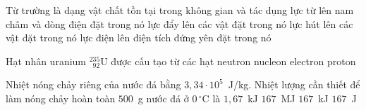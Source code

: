 	\begin{ex}%
		Từ trường là dạng vật chất tồn tại trong không gian và tác dụng
		\choice
		{\True lực từ lên nam châm và dòng điện đặt trong nó}
		{lực đẩy lên các vật đặt trong nó}
		{lực hút lên các vật đặt trong nó}
		{lực điện lên điện tích đứng yên đặt trong nó}
	\end{ex}

	\begin{ex}%
		Hạt nhân uranium $^{235}_{\phantom{2}92}\text{U}$ được cấu tạo từ các hạt
		\choice
		{neutron}
		{\True nucleon}
		{electron}
		{proton}
	\end{ex}

	\begin{ex}%
		Nhiệt nóng chảy riêng của nước đá bằng $3{,}34\cdot 10^5$~J/kg. Nhiệt lượng cần thiết để làm nóng chảy hoàn toàn $500$~g nước đá ở $0\,^\circ\text{C}$ là
		\choice
		{$1{,}67$~kJ}
		{$167$~MJ}
		{\True $167$~kJ}
		{$167$~J}
	\end{ex}

